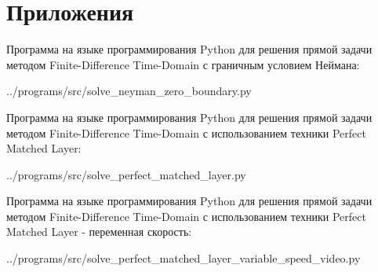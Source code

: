 \section*{Приложения}

Программа на языке программирования Python
для решения прямой задачи методом Finite-Difference Time-Domain
с граничным условием Неймана:

{../programs/src/solve_neyman_zero_boundary.py}

Программа на языке программирования Python
для решения прямой задачи методом Finite-Difference Time-Domain
с использованием техники Perfect Matched Layer:

{../programs/src/solve_perfect_matched_layer.py}

Программа на языке программирования Python
для решения прямой задачи методом Finite-Difference Time-Domain
с использованием техники Perfect Matched Layer - переменная скорость:

{../programs/src/solve_perfect_matched_layer_variable_speed_video.py}
